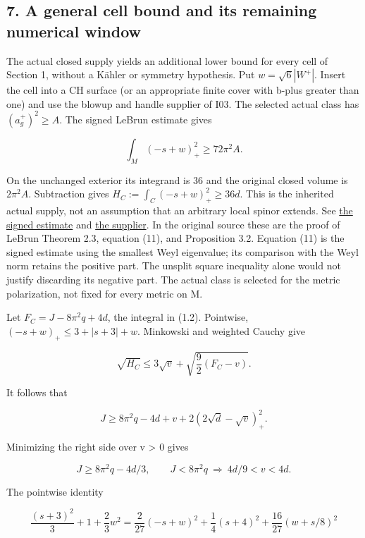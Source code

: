 \documentclass[
  10pt,
]{article}
\begin{document}
\hypertarget{a-general-cell-bound-and-its-remaining-numerical-window}{%
\subsection{7. A general cell bound and its remaining numerical
window}\label{a-general-cell-bound-and-its-remaining-numerical-window}}

The actual closed supply yields an additional lower bound for every cell
of Section 1, without a Kähler or symmetry hypothesis. Put
\(w=\sqrt6|W^+|\). Insert the cell into a CH surface (or an appropriate
finite cover with b-plus greater than one) and use the blowup and handle
supplier of I03. The selected actual class has \((a_g^+)^2\ge A\). The
signed LeBrun estimate gives

\[
 \int_M(-s+w)_+^2\ge72\pi^2 A.
\]

On the unchanged exterior its integrand is 36 and the original closed
volume is \(2\pi^2A\). Subtraction gives
\(H_C:=\int_C(-s+w)_+^2\ge36d\). This is the inherited actual supply,
not an assumption that an arbitrary local spinor extends. See
\href{../mathematics/current/line1_functional_pencil.md}{the signed
estimate} and
\href{../mathematics/current/lebrun_stability_closure.md}{the supplier}.
In the original source these are the proof of LeBrun Theorem 2.3,
equation (11), and Proposition 3.2. Equation (11) is the signed estimate
using the smallest Weyl eigenvalue; its comparison with the Weyl norm
retains the positive part. The unsplit square inequality alone would not
justify discarding its negative part. The actual class is selected for
the metric polarization, not fixed for every metric on M.

Let \(F_C=J-8\pi^2q+4d\), the integral in (1.2). Pointwise,
\((-s+w)_+\le3+|s+3|+w\). Minkowski and weighted Cauchy give

\[
 \sqrt{H_C}\le3\sqrt v+
 \sqrt{\frac92(F_C-v)}.
\]

It follows that

\[
 \boxed{J\ge8\pi^2q-4d+v+2(2\sqrt d-\sqrt v)_+^2.}             \tag{7.1}
\]

Minimizing the right side over v \textgreater{} 0 gives

\[
 J\ge8\pi^2q-4d/3,\qquad
 J<8\pi^2q\ \Longrightarrow\ 4d/9<v<4d.                       \tag{7.2}
\]

The pointwise identity

\[
 \frac{(s+3)^2}{3}+1+\frac23w^2
 =\frac2{27}(-s+w)^2+\frac14(s+4)^2
                            +\frac{16}{27}(w+s/8)^2
\]
\end{document}
